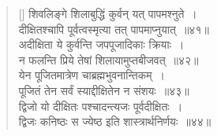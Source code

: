 \documentclass[twoside,12pt,notitlepage]{book}
\begin{document}
\begin{verse}[\versewidth]
शिवलिङ्गे शिलाबुद्धिं कुर्वन् यत् पापमश्नुते~।\\[-6pt]
दीक्षितश्चापि पूर्वत्वस्मृत्या तत् पापमाप्नुयात्~॥४१॥\\
अदीक्षिता ये कुर्वन्ति जपपूजादिकाः क्रियाः~।\\[-6pt]
न फलन्ति प्रिये तेषां शिलायामुप्तबीजवत्~॥४२॥\\
येन पूजितमात्रेण चाब्रह्मभुवनान्तिकम्~।\\[-6pt]
पूजितं तेन सर्वं स्याद्दीक्षितेन न संशयः~॥४३॥\\
द्विजो यो दीक्षितः पश्चादन्त्यजः पूर्वदीक्षितः~।\\[-6pt]
द्विजः कनिष्ठः स ज्येष्ठ इति शास्त्रार्थनिर्णयः~॥४४॥\\
\end{verse}
\end{document}
